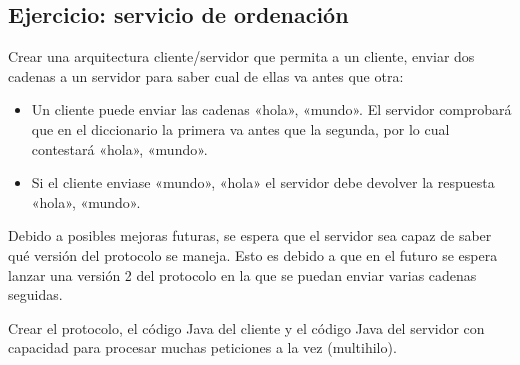 \documentclass[letterpaper,10pt,spanish]{sphinxmanual}
\begin{document}
\begin{sphinxVerbatim}[commandchars=\\\{\}]
                                   
                    
\end{sphinxVerbatim}


\subsection{Ejercicio: servicio de ordenación}
\label{\detokenize{textos/tema3:ejercicio-servicio-de-ordenacion}}
Crear una arquitectura cliente/servidor que permita a un cliente, enviar dos cadenas a un servidor para saber cual de ellas va antes que otra:
\begin{itemize}
\item {} 
Un cliente puede enviar las cadenas «hola», «mundo». El servidor comprobará que en el diccionario la primera va antes que la segunda, por lo cual contestará «hola», «mundo».

\item {} 
Si el cliente enviase «mundo», «hola» el servidor debe devolver la respuesta «hola», «mundo».

\end{itemize}

Debido a posibles mejoras futuras, se espera que el servidor sea capaz de saber qué versión del protocolo se maneja. Esto es debido a que en el futuro se espera lanzar una versión 2 del protocolo en la que se puedan enviar varias cadenas seguidas.

Crear el protocolo, el código Java del cliente y el código Java del servidor con capacidad para procesar muchas peticiones a la vez (multihilo).
\end{document}
